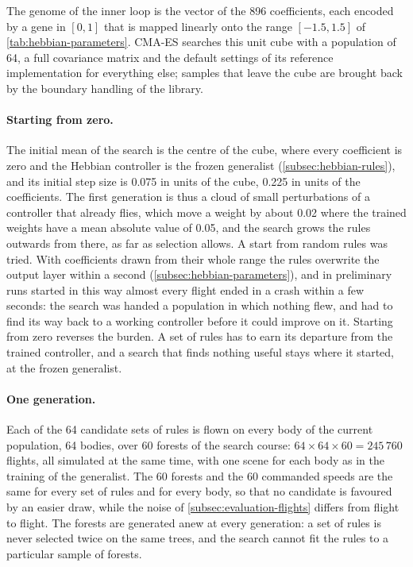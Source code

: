 The genome of the inner loop is the vector of the 896 coefficients, each encoded by a gene in $[0, 1]$ that is mapped linearly onto the range $[-1.5, 1.5]$ of \autoref{tab:hebbian-parameters}. CMA-ES searches this unit cube with a population of 64, a full covariance matrix and the default settings of its reference implementation for everything else; samples that leave the cube are brought back by the boundary handling of the library.

\paragraph{Starting from zero.} The initial mean of the search is the centre of the cube, where every coefficient is zero and the Hebbian controller is the frozen generalist (\autoref{subsec:hebbian-rules}), and its initial step size is 0.075 in units of the cube, 0.225 in units of the coefficients. The first generation is thus a cloud of small perturbations of a controller that already flies, which move a weight by about 0.02 where the trained weights have a mean absolute value of 0.05, and the search grows the rules outwards from there, as far as selection allows. A start from random rules was tried. With coefficients drawn from their whole range the rules overwrite the output layer within a second (\autoref{subsec:hebbian-parameters}), and in preliminary runs started in this way almost every flight ended in a crash within a few seconds: the search was handed a population in which nothing flew, and had to find its way back to a working controller before it could improve on it. Starting from zero reverses the burden. A set of rules has to earn its departure from the trained controller, and a search that finds nothing useful stays where it started, at the frozen generalist.

\paragraph{One generation.} Each of the 64 candidate sets of rules is flown on every body of the current population, 64 bodies, over 60 forests of the search course: $64 \times 64 \times 60 = 245\,760$ flights, all simulated at the same time, with one scene for each body as in the training of the generalist. The 60 forests and the 60 commanded speeds are the same for every set of rules and for every body, so that no candidate is favoured by an easier draw, while the noise of \autoref{subsec:evaluation-flights} differs from flight to flight. The forests are generated anew at every generation: a set of rules is never selected twice on the same trees, and the search cannot fit the rules to a particular sample of forests.

